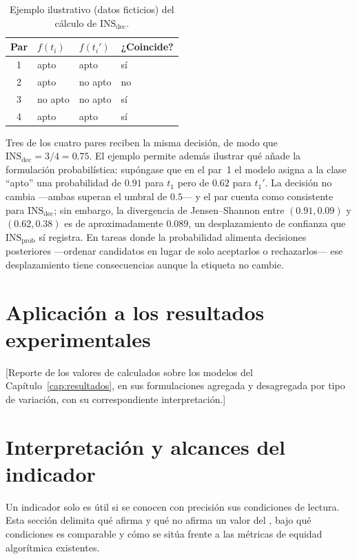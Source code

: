 \begin{table}[H]
  \centering
  \caption[Ejemplo ilustrativo del cálculo del \INS de decisión.]{Ejemplo
  ilustrativo (datos ficticios) del cálculo de
  $\mathrm{INS}_{\mathrm{dec}}$.}
  \label{tab:ejemplo-ins}
  \begin{tabular}{clll}
    \toprule
    \textbf{Par} & $f(t_i)$ & $f(t_i')$ & \textbf{¿Coincide?} \\
    \midrule
    1 & apto    & apto    & sí \\
    2 & apto    & no apto & no \\
    3 & no apto & no apto & sí \\
    4 & apto    & apto    & sí \\
    \bottomrule
  \end{tabular}
\end{table}

Tres de los cuatro pares reciben la misma decisión, de modo que
$\mathrm{INS}_{\mathrm{dec}} = 3/4 = 0.75$. El ejemplo permite además
ilustrar qué añade la formulación probabilística: supóngase que en el par~1
el modelo asigna a la clase ``apto'' una probabilidad de $0.91$ para $t_1$
pero de $0.62$ para $t_1'$. La decisión no cambia ---ambas superan el umbral
de $0.5$--- y el par cuenta como consistente para
$\mathrm{INS}_{\mathrm{dec}}$; sin embargo, la divergencia de
Jensen--Shannon entre $(0.91, 0.09)$ y $(0.62, 0.38)$ es de
aproximadamente $0.089$, un desplazamiento de confianza que
$\mathrm{INS}_{\mathrm{prob}}$ sí registra. En tareas donde la probabilidad
alimenta decisiones posteriores ---ordenar candidatos en lugar de solo
aceptarlos o rechazarlos--- ese desplazamiento tiene consecuencias aunque la
etiqueta no cambie.

\section{Aplicación a los resultados experimentales}
\label{sec:ins-aplicacion}

[Reporte de los valores de \INS calculados sobre los modelos del
Capítulo~\ref{cap:resultados}, en sus formulaciones agregada y desagregada
por tipo de variación, con su correspondiente interpretación.]

\section{Interpretación y alcances del indicador}
\label{sec:ins-interpretacion}

Un indicador solo es útil si se conocen con precisión sus condiciones de
lectura. Esta sección delimita qué afirma y qué no afirma un valor del \INS,
bajo qué condiciones es comparable y cómo se sitúa frente a las métricas de
equidad algorítmica existentes.

